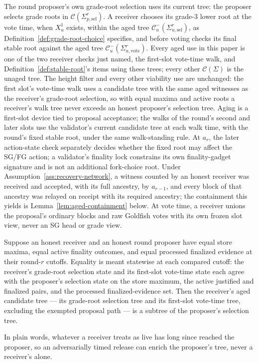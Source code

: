 \begin{remark}
\label{rem:aged-scope}
The round proposer's own grade-root selection uses its current tree:
the proposer selects grade roots in
\(\mathcal C(\Sigma_{p,\mathrm{sel}}^r)\).  A receiver chooses
its grade-3 lower root at the vote time, when \(X_u^1\) exists,
within the aged tree
\(\mathcal C^{-}_u(\Sigma_{u,\mathrm{sel}}^r)\), as
Definition~\ref{def:grade-root-choice} specifies, and before voting checks
its final stable root against the aged tree
\(\mathcal C^{-}_u(\Sigma_{u,\mathrm{vote}}^r)\).  Every aged use
in this paper is one of the two receiver checks just named, the
first-slot vote-time walk, and Definition~\ref{def:stable-root}'s
items using these trees; every other \(\mathcal C(\Sigma)\) is the
unaged tree.  The height filter and every other viability use are
unchanged: the first slot's vote-time walk uses a candidate tree with
the same aged witnesses as the receiver's grade-root selection, so
with equal maxima and active roots a receiver's walk tree never
exceeds an honest proposer's selection tree.  Aging is a first-slot
device tied to proposal acceptance; the walks of the round's second
and later slots use the validator's current candidate tree at each
walk time, with the round's fixed stable root, under the same
walk-standing rule.  At \(a_r\), the later action-state check
separately decides whether the fixed root may affect the SG/FG
action; a validator's finality lock constrains its own
finality-gadget signature and is not an additional fork-choice root.
Under Assumption~\ref{ass:recovery-network}, a witness counted by an
honest receiver was received and accepted, with its full ancestry, by
\(a_{r-1}\), and every block of that ancestry was relayed on receipt
with its required ancestry; the containment this yields is
Lemma~\ref{lem:aged-containment} below.  At vote time, a receiver
unions the proposal's ordinary blocks and raw Goldfish votes with its
own frozen slot view, never an SG head or grade view.
\end{remark}

\begin{lemma}
\label{lem:aged-containment}
Suppose an honest receiver and an honest round proposer have equal store
maxima, equal active finality outcomes, and equal processed finalized
evidence at their round-\(r\) cutoffs.  Equality is meant statewise at
each compared cutoff: the receiver's grade-root selection state and its
first-slot vote-time state each agree with the proposer's selection
state on the store maximum, the active justified and finalized pairs,
and the processed finalized-evidence set.  Then the receiver's aged
candidate tree --- its grade-root selection tree and its first-slot
vote-time tree, excluding the exempted proposal path --- is a subtree of
the proposer's selection tree.

In plain words, whatever a receiver treats as live has long since
reached the proposer, so an adversarially timed release can enrich the
proposer's tree, never a receiver's alone.
\end{lemma}

